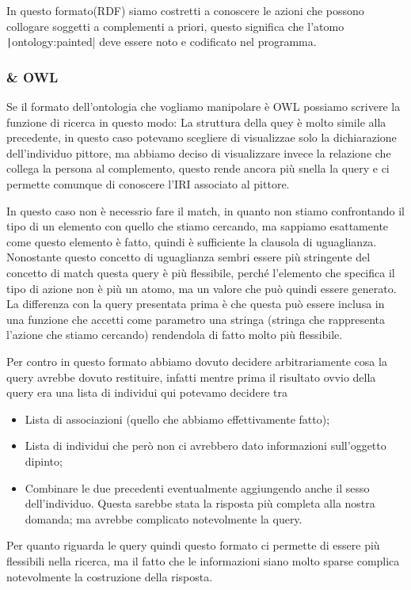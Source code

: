 		In questo formato(RDF) siamo costretti a conoscere le azioni che possono collogare soggetti a complementi a priori, questo significa che l'atomo \texttt|ontology:painted| deve essere noto e codificato nel  programma. 
		
	\subsubsection{\cduce \& OWL}
		Se il formato dell'ontologia che vogliamo manipolare è OWL possiamo scrivere la funzione di ricerca in questo modo:
		La struttura della quey è molto simile alla precedente, in questo caso potevamo scegliere di visualizzae solo la dichiarazione dell'individuo pittore, ma abbiamo deciso di visualizzare invece la relazione che collega la persona al complemento, questo rende ancora più snella la query e ci permette comunque di conoscere l'IRI associato al pittore.
		
		In questo caso non è necessrio fare il match, in quanto non stiamo confrontando il tipo di un elemento con quello che stiamo cercando, ma sappiamo esattamente come questo elemento è fatto, quindi è sufficiente la clausola di uguaglianza. Nonostante questo concetto di uguaglianza sembri essere più stringente del concetto di match questa query è più flessibile, perché l'elemento che specifica il tipo di azione non è più un atomo, ma un valore che può quindi essere generato. La differenza con la query presentata prima è che questa può essere inclusa in una funzione che accetti come parametro una stringa (stringa che rappresenta l'azione che stiamo cercando) rendendola di fatto molto più flessibile.
		
		Per contro in questo formato abbiamo dovuto decidere arbitrariamente cosa la query avrebbe dovuto restituire, infatti mentre prima il risultato ovvio della query era una lista di individui qui potevamo decidere tra
		\begin{itemize}
			\item Lista di associazioni (quello che abbiamo effettivamente fatto);
			\item Lista di individui che però non ci avrebbero dato informazioni sull'oggetto dipinto;
			\item Combinare le due precedenti eventualmente aggiungendo anche il sesso dell'individuo. Questa sarebbe stata la risposta più completa alla nostra domanda; ma avrebbe complicato notevolmente la query.
		\end{itemize}
		
		Per quanto riguarda le query quindi questo formato ci permette di essere più flessibili  nella ricerca, ma il fatto che le informazioni siano molto sparse complica notevolmente la costruzione della risposta.
		
		